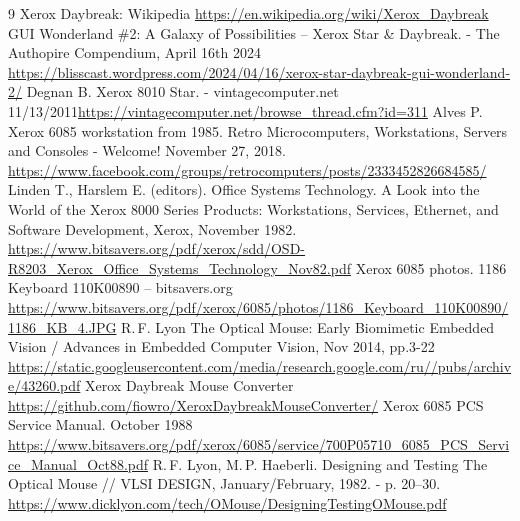 \documentclass[11pt, a4paper]{article}
\begin{document}
\begin{thebibliography}{9}
 Xerox Daybreak: Wikipedia \url{https://en.wikipedia.org/wiki/Xerox_Daybreak}
 GUI Wonderland \#2: A Galaxy of Possibilities – Xerox Star \& Daybreak. - The Authopire Compendium, April 16th 2024 \url{https://blisscast.wordpress.com/2024/04/16/xerox-star-daybreak-gui-wonderland-2/}
 Degnan B. Xerox 8010 Star. - vintagecomputer.net 11/13/2011\url{https://vintagecomputer.net/browse_thread.cfm?id=311}
 Alves P. Xerox 6085 workstation from 1985. Retro Microcomputers, Workstations, Servers and Consoles - Welcome! November 27, 2018. \url{https://www.facebook.com/groups/retrocomputers/posts/2333452826684585/}
 Linden T., Harslem E. (editors). Office Systems Technology. A Look into the World of the Xerox 8000 Series Products: Workstations, Services, Ethernet, and Software Development, Xerox, November 1982. \url{https://www.bitsavers.org/pdf/xerox/sdd/OSD-R8203_Xerox_Office_Systems_Technology_Nov82.pdf}
 Xerox 6085 photos. 1186 Keyboard 110K00890 -- bitsavers.org \url{https://www.bitsavers.org/pdf/xerox/6085/photos/1186_Keyboard_110K00890/1186_KB_4.JPG}
 R.\,F. Lyon The Optical Mouse: Early Biomimetic Embedded Vision / Advances in Embedded Computer Vision, Nov 2014, pp.3-22 \url{https://static.googleusercontent.com/media/research.google.com/ru//pubs/archive/43260.pdf}
 Xerox Daybreak Mouse Converter \url{https://github.com/fiowro/XeroxDaybreakMouseConverter/}
 Xerox 6085 PCS Service Manual. October 1988 \url{https://www.bitsavers.org/pdf/xerox/6085/service/700P05710_6085_PCS_Service_Manual_Oct88.pdf}
 R.\,F. Lyon, M.\,P. Haeberli. Designing and Testing The Optical Mouse // VLSI DESIGN, January/February, 1982. - p. 20--30. \url{https://www.dicklyon.com/tech/OMouse/DesigningTestingOMouse.pdf}
\end{thebibliography}
\end{document}
